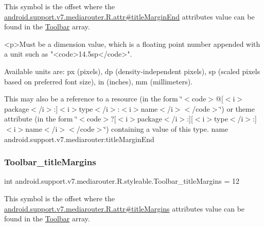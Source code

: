 This symbol is the offset where the \hyperlink{classandroid_1_1support_1_1v7_1_1mediarouter_1_1R_1_1attr_a52541b0c2f637e47a0aec99ecf3a1016}{android.\+support.\+v7.\+mediarouter.\+R.\+attr\#title\+Margin\+End} attribute\textquotesingle{}s value can be found in the \hyperlink{classandroid_1_1support_1_1v7_1_1mediarouter_1_1R_1_1styleable_a6815cdfaadde30c82b955863af196899}{Toolbar} array.

\begin{DoxyVerb}      <p>Must be a dimension value, which is a floating point number appended with a unit such as "<code>14.5sp</code>".
\end{DoxyVerb}
 Available units are\+: px (pixels), dp (density-\/independent pixels), sp (scaled pixels based on preferred font size), in (inches), mm (millimeters). 

This may also be a reference to a resource (in the form \char`\"{}$<$code$>$@\mbox{[}$<$i$>$package$<$/i$>$\+:\mbox{]}$<$i$>$type$<$/i$>$\+:$<$i$>$name$<$/i$>$$<$/code$>$\char`\"{}) or theme attribute (in the form \char`\"{}$<$code$>$?\mbox{[}$<$i$>$package$<$/i$>$\+:\mbox{]}\mbox{[}$<$i$>$type$<$/i$>$\+:\mbox{]}$<$i$>$name$<$/i$>$$<$/code$>$\char`\"{}) containing a value of this type.  name android.\+support.\+v7.\+mediarouter\+:title\+Margin\+End \mbox{\label{classandroid_1_1support_1_1v7_1_1mediarouter_1_1R_1_1styleable_ad349f87bff8904fab761a52216460a76}} 
\subsubsection{\texorpdfstring{Toolbar\+\_\+title\+Margins}{Toolbar\_titleMargins}}
{\footnotesize\ttfamily int android.\+support.\+v7.\+mediarouter.\+R.\+styleable.\+Toolbar\+\_\+title\+Margins = 12\hspace{0.3cm}{\ttfamily [static]}}

This symbol is the offset where the \hyperlink{classandroid_1_1support_1_1v7_1_1mediarouter_1_1R_1_1attr_a6c4fad1182a34cacceda1bb43c2edf65}{android.\+support.\+v7.\+mediarouter.\+R.\+attr\#title\+Margins} attribute\textquotesingle{}s value can be found in the \hyperlink{classandroid_1_1support_1_1v7_1_1mediarouter_1_1R_1_1styleable_a6815cdfaadde30c82b955863af196899}{Toolbar} array.

